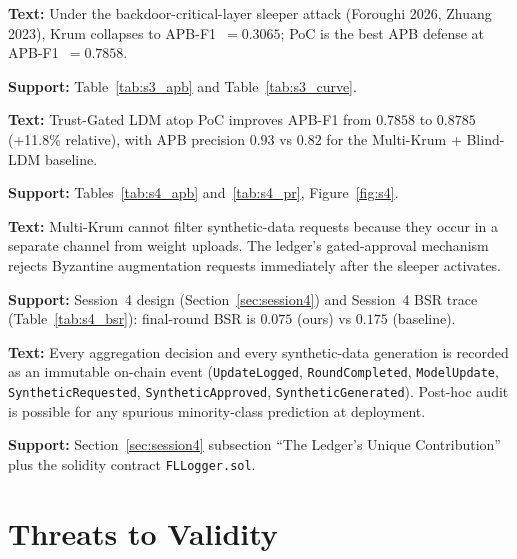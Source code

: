 \documentclass[11pt,a4paper]{article}
\begin{document}
\begin{claimbox}
\textbf{Text:} Under the backdoor-critical-layer sleeper attack
(Foroughi 2026, Zhuang 2023), Krum collapses to APB-F1~$=0.3065$; PoC
is the best APB defense at APB-F1~$=0.7858$.

\textbf{Support:} Table~\ref{tab:s3_apb} and Table~\ref{tab:s3_curve}.
\end{claimbox}

\begin{claimbox}
\textbf{Text:} Trust-Gated LDM atop PoC improves APB-F1 from $0.7858$
to $0.8785$ (+11.8\% relative), with APB precision $0.93$ vs $0.82$ for
the Multi-Krum + Blind-LDM baseline.

\textbf{Support:} Tables~\ref{tab:s4_apb} and~\ref{tab:s4_pr},
Figure~\ref{fig:s4}.
\end{claimbox}

\begin{claimbox}
\textbf{Text:} Multi-Krum cannot filter synthetic-data requests because
they occur in a separate channel from weight uploads. The ledger's
gated-approval mechanism rejects Byzantine augmentation requests
immediately after the sleeper activates.

\textbf{Support:} Session~4 design (Section~\ref{sec:session4}) and
Session~4 BSR trace (Table~\ref{tab:s4_bsr}): final-round BSR is $0.075$
(ours) vs $0.175$ (baseline).
\end{claimbox}

\begin{claimbox}
\textbf{Text:} Every aggregation decision and every synthetic-data
generation is recorded as an immutable on-chain event
(\texttt{UpdateLogged}, \texttt{RoundCompleted}, \texttt{ModelUpdate},
\texttt{SyntheticRequested}, \texttt{SyntheticApproved},
\texttt{SyntheticGenerated}). Post-hoc audit is possible for any spurious
minority-class prediction at deployment.

\textbf{Support:} Section~\ref{sec:session4} subsection ``The Ledger's
Unique Contribution'' plus the solidity contract \texttt{FLLogger.sol}.
\end{claimbox}

\section{Threats to Validity}
\label{sec:threats}
\end{document}
